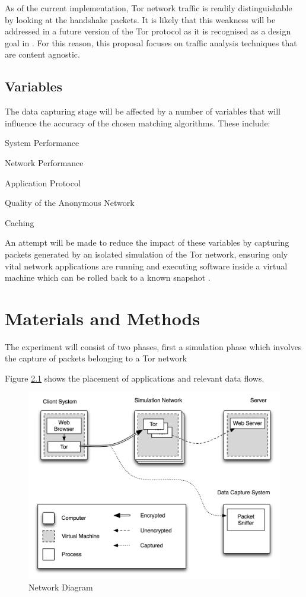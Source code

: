 \documentclass{conference}
\begin{document}
As of the current implementation, Tor network traffic is readily distinguishable by looking at the handshake packets. It is likely that this weakness will be addressed in a future version of the Tor protocol as it is recognised as a design goal in \cite{Dingledine:2008p1542}. For this reason, this proposal focuses on traffic analysis techniques that are content agnostic.

\section{Variables}

The data capturing stage will be affected by a number of variables that will influence the accuracy of the chosen matching algorithms. These include:

\begin{enumerate*}
\item System Performance
\item Network Performance
\item Application Protocol
\item Quality of the Anonymous Network
\item Caching
\end{enumerate*}

An attempt will be made to reduce the impact of these variables by capturing packets generated by an isolated simulation of the Tor network, ensuring only vital network applications are running and executing software inside a virtual machine which can be rolled back to a known snapshot \citep{website:snapshot-definition}.

\chapter{Materials and Methods}

The experiment will consist of two phases, first a simulation phase which involves the capture of packets belonging to a Tor network

Figure \ref{network-diagram} shows the placement of applications and relevant data flows.

\begin{figure}
\center \includegraphics[scale=0.8]{network-diagram}
\caption{Network Diagram}
\label{network-diagram}
\end{figure}


\end{document}
